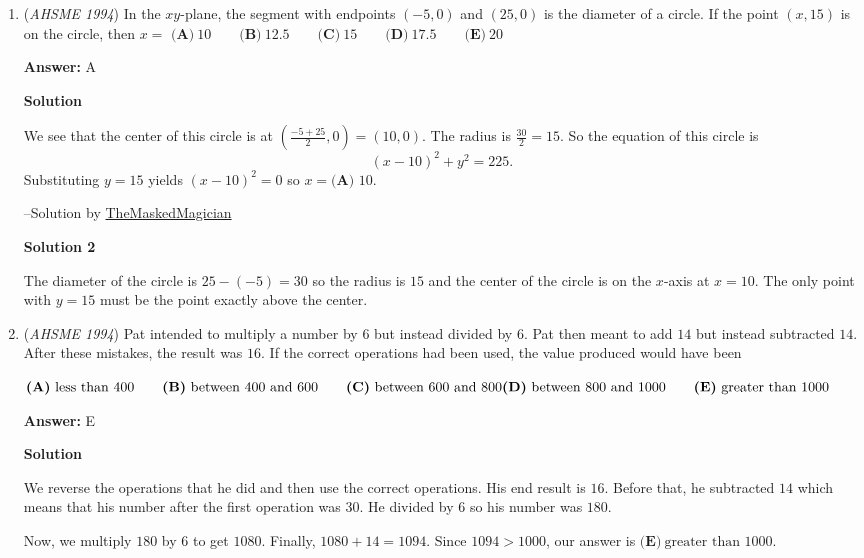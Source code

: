 \begin{enumerate}
 


	\item (\textit{AHSME 1994}) In the $xy$-plane, the segment with endpoints $(-5,0)$ and $(25,0)$ is the diameter of a circle. If the point $(x,15)$ is on the circle, then $x=$
$\textbf{(A)}\ 10 \qquad\textbf{(B)}\ 12.5 \qquad\textbf{(C)}\ 15\qquad\textbf{(D)}\ 17.5 \qquad\textbf{(E)}\ 20$

 \textbf{Answer: }A



\textbf{Solution}

We see that the center of this circle is at $\left(\frac{-5+25}{2},0\right)=(10,0)$. The radius is $\frac{30}{2}=15$. So the equation of this circle is 
 \[(x-10)^2+y^2=225.\] Substituting $y=15$ yields $(x-10)^2=0$ so $x=\boxed{\textbf{(A) }10}$.

 --Solution by \href{https://artofproblemsolving.comhttp://www.artofproblemsolving.com/Forum/memberlist.php?mode=viewprofile&u=200685}{TheMaskedMagician}

 



\textbf{Solution 2}

The diameter of the circle is $25- (-5)=30$ so the radius is $15$ and the center of the circle is on the $x$-axis at $x=10$.  The only point with $y=15$ must be the point exactly above the center.

 


	\item (\textit{AHSME 1994}) Pat intended to multiply a number by $6$ but instead divided by $6$. Pat then meant to add $14$ but instead subtracted $14$. After these mistakes, the result was $16$. If the correct operations had been used, the value produced would have been


 $\textbf{(A)}\ \text{less than 400} \qquad\textbf{(B)}\ \text{between 400 and 600} \qquad\textbf{(C)}\ \text{between 600 and 800} \\ \textbf{(D)}\ \text{between 800 and 1000} \qquad\textbf{(E)}\ \text{greater than 1000}$

 \textbf{Answer: }E



\textbf{Solution}

We reverse the operations that he did and then use the correct operations. His end result is $16$. Before that, he subtracted $14$ which means that his number after the first operation was $30$. He divided by $6$ so his number was $180$. 

 Now, we multiply $180$ by $6$ to get $1080$. Finally, $1080+14=1094$. Since $1094>1000$, our answer is $\boxed{\textbf{(E)}\ \text{greater than 1000}}$.


\end{enumerate}
